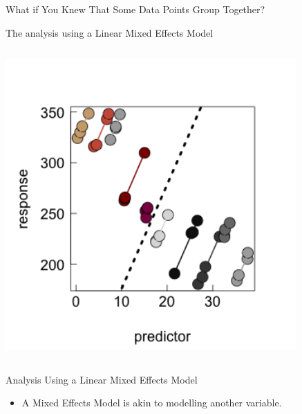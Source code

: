 \documentclass{beamer}
\begin{document}
\begin{frame}{What if You Knew That Some Data Points Group Together?}

The analysis using a Linear Mixed Effects Model
\begin{columns}[onlytextwidth] %
    \begin{column}{0.5\textwidth}
    \includegraphics[width=0.999\textwidth]{lectures/day_1_intro_to_mems/figures/unnamed-chunk-14-1.png} %
  \end{column}
    \hspace{0.0\textwidth} %
\begin{column}{0.7\textwidth}
    \scalebox{0.6}{
      
      }
    \end{column}
  \end{columns}

\end{frame}


\begin{frame}{Analysis Using a Linear Mixed Effects Model}
  \begin{itemize}
    \item A Mixed Effects Model is akin to modelling another variable.
  \end{itemize}

  \scalebox{0.8}{
      
      }
      
\end{frame}
\end{document}
